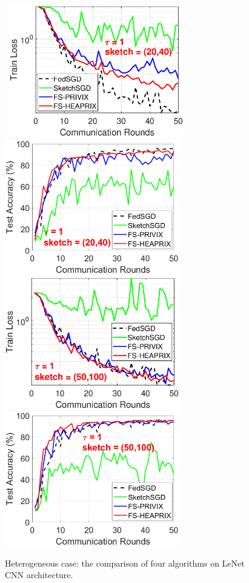 \begin{figure}[h]
	\begin{center}
		\mbox{			    \includegraphics[width=3in]{MNIST_figures/local1_sketch20_iid0_train_loss.eps}
		\includegraphics[width=3in]{MNIST_figures/local1_sketch20_iid0_test_acc.eps}
		}
		\mbox{
		\includegraphics[width=3in]{MNIST_figures/local1_sketch50_iid0_train_loss.eps}
		\includegraphics[width=3in]{MNIST_figures/local1_sketch50_iid0_test_acc.eps}
		}
	\end{center}
	\caption{Heterogeneous case: the comparison of four algorithms on LeNet CNN architecture.}
    \label{fig:MNIST-tau1-iid0}
\end{figure}


